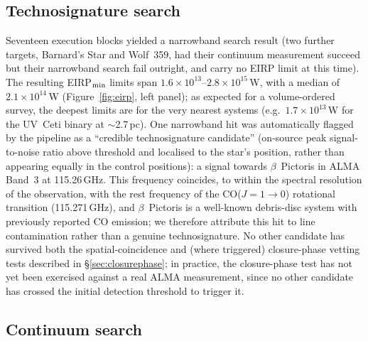 \documentclass{openjournal}
\begin{document}
\subsection{Technosignature search}

Seventeen execution blocks yielded a narrowband search result (two
further targets, Barnard's Star and Wolf~359, had their continuum
measurement succeed but their narrowband search fail outright, and carry
no EIRP limit at this time). The resulting EIRP$_{\rm min}$ limits span
$1.6\times10^{13}$--$2.8\times10^{15}$\,W, with a median of
$2.1\times10^{14}$\,W (Figure~\ref{fig:eirp}, left panel); as expected
for a volume-ordered survey, the deepest limits are for the very nearest
systems (e.g.\ $1.7\times10^{13}$\,W for the UV~Ceti binary at $\sim$2.7\,pc).
One narrowband hit was automatically flagged by the pipeline as a
``credible technosignature candidate'' (on-source peak signal-to-noise
ratio above threshold and localised to the star's position, rather than
appearing equally in the control positions): a signal towards $\beta$~Pictoris
in ALMA Band~3 at 115.26\,GHz. This frequency coincides, to within the
spectral resolution of the observation, with the rest frequency of the
CO($J=1\to0$) rotational transition (115.271\,GHz), and $\beta$~Pictoris
is a well-known debris-disc system with previously reported CO emission;
we therefore attribute this hit to line contamination rather than a
genuine technosignature. No other candidate has survived both the
spatial-coincidence and (where triggered) closure-phase vetting tests
described in \S\ref{sec:closurephase}; in practice, the closure-phase test
has not yet been exercised against a real ALMA measurement, since no
other candidate has crossed the initial detection threshold to trigger it.

\subsection{Continuum search}
\end{document}
